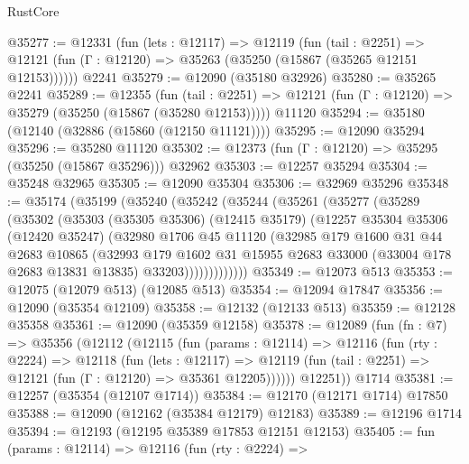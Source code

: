 \begin{lexlean}{RustCore}
\begin{coremodule}
@35277 := @12331
    (fun (lets : @12117) =>
    @12119
      (fun (tail : @2251) =>
      @12121 (fun (Γ : @12120) => @35263 (@35250 (@15867 (@35265 @12151 @12153))))))
    @2241
@35279 := @12090 (@35180 @32926)
@35280 := @35265 @2241
@35289 := @12355
    (fun (tail : @2251) => @12121 (fun (Γ : @12120) => @35279 (@35250 (@15867 (@35280 @12153)))))
    @11120
@35294 := @35180 (@12140 (@32886 (@15860 (@12150 @11121))))
@35295 := @12090 @35294
@35296 := @35280 @11120
@35302 := @12373 (fun (Γ : @12120) => @35295 (@35250 (@15867 @35296))) @32962
@35303 := @12257 @35294
@35304 := @35248 @32965
@35305 := @12090 @35304
@35306 := @32969 @35296
@35348 := @35174
    (@35199
      (@35240
        (@35242
          (@35244
            (@35261
              (@35277
                (@35289
                  (@35302
                    (@35303
                      (@35305 @35306)
                      (@12415 @35179)
                      (@12257
                        @35304
                        @35306
                        (@12420 @35247)
                        (@32980
                          @1706
                          @45
                          @11120
                          (@32985
                            @179
                            @1600
                            @31
                            @44
                            @2683
                            @10865
                            (@32993
                              @179
                              @1602
                              @31
                              @15955
                              @2683
                              @33000
                              (@33004 @178 @2683 @13831 @13835)
                              @33203)))))))))))))
@35349 := @12073 @513
@35353 := @12075 (@12079 @513) (@12085 @513)
@35354 := @12094 @17847
@35356 := @12090 (@35354 @12109)
@35358 := @12132 (@12133 @513)
@35359 := @12128 @35358
@35361 := @12090 (@35359 @12158)
@35378 := @12089
    (fun (fn : @7) =>
    @35356
      (@12112
        (@12115
          (fun (params : @12114) =>
          @12116
            (fun (rty : @2224) =>
            @12118
              (fun (lets : @12117) =>
              @12119 (fun (tail : @2251) => @12121 (fun (Γ : @12120) => @35361 @12205))))))
        @12251))
    @1714
@35381 := @12257 (@35354 (@12107 @1714))
@35384 := @12170 (@12171 @1714) @17850
@35388 := @12090 (@12162 (@35384 @12179) @12183)
@35389 := @12196 @1714
@35394 := @12193 (@12195 @35389 @17853 @12151 @12153)
@35405 := fun (params : @12114) =>
  @12116
    (fun (rty : @2224) =>

\end{coremodule}
\end{lexlean}
